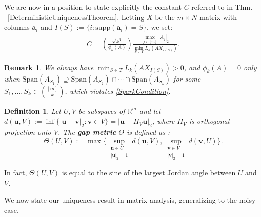 \documentclass[journal, twocolumn]{IEEEtran}
\newtheorem{definition}{Definition}
\newtheorem{remark}{Remark}
\begin{document}
We are now in a position to state explicitly the constant $C$ referred to in Thm. ~\ref{DeterministicUniquenessTheorem}. Letting 
$X$ be the $m \times N$ matrix with columns $\mathbf{a}_i$ and $I(S) := \{i : \text{supp}(\mathbf{a}_i) = S\}$, we set:
\begin{align}\label{Cdef}
C = \left( \frac{ \sqrt{k^3}}{ \phi_k(A) } \right) \frac{\max_{j \in [m]} |A_j|_2}{\min_{S \in T} L_k(AX_{I(S)})}.
\end{align}

\begin{remark}\label{nonzero}
We always have $\min_{S \in T} L_k(AX_{I(S)}) > 0$, and $\phi_k(A) = 0$ only when $\text{Span}(A_{S_1}) \supseteq \text{Span}(A_{S_2}) \cap \cdots \cap \text{Span}(A_{S_k})$ for some $S_1, \ldots, S_k \in {[m] \choose k}$, which violates \eqref{SparkCondition}.
\end{remark}

\begin{definition}\label{GapMetricDef}
Let $U, V$ be subspaces of $\mathbb{R}^m$ and let $d(\mathbf{u},V) := \inf\{|\mathbf{u}-\mathbf{v}|_2: \mathbf{v} \in V\} = |\mathbf{u} - \Pi_V \mathbf{u}|_2$, where $\Pi_V$ is orthogonal projection onto $V$. The \textbf{gap metric} $\Theta$ is defined as \cite{Akhiezer13}:
\begin{equation*}
\Theta(U,V) := \max \big\{ \sup_{\substack{\mathbf{u} \in U \\ |\mathbf{u}|_2 = 1}} d(\mathbf{u},V), \sup_{\substack{\mathbf{v} \in V \\ |\mathbf{v}|_2 = 1}} d(\mathbf{v},U) \big\}.
\end{equation*}
\end{definition}

In fact, $\Theta(U,V)$ is equal to the sine of the largest Jordan angle between $U$ and $V$. 

We now state our uniqueness result in matrix analysis, generalizing \cite[Lem.~1]{Hillar15} to the noisy case.
\end{document}
